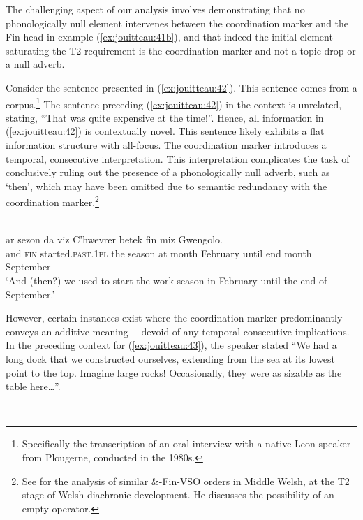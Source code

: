 \documentclass[output=paper,colorlinks,citecolor=brown]{langscibook}
\begin{document}
The challenging aspect of our analysis involves demonstrating that no phonologically null element intervenes between the coordination marker and the Fin head in example (\ref{ex:jouitteau:41b}), and that indeed the initial element saturating the T2 requirement is the coordination marker and not a topic-drop or a null adverb. 

Consider the sentence presented in (\ref{ex:jouitteau:42}). This sentence comes from a corpus.\footnote{Specifically the transcription of an oral interview with a native Leon speaker from Plougerne, conducted in the 1980s.} The sentence preceding (\ref{ex:jouitteau:42}) in the context is unrelated, stating, “That was quite expensive at the time!”. Hence, all information in (\ref{ex:jouitteau:42}) is contextually novel. This sentence likely exhibits a flat information structure with all-focus. The coordination marker introduces a temporal, consecutive interpretation. This interpretation complicates the task of conclusively ruling out the presence of a phonologically null adverb, such as ‘then’, which may have been omitted due to semantic redundancy with the coordination marker.\footnote{See \citet{mj:Willis1997} for the analysis of similar \&-Fin-VSO orders in Middle Welsh, at the T2 stage of Welsh diachronic development. He discusses the possibility of an empty operator.}


\ea \label{ex:jouitteau:42} \\
\gll {} {}    {} ar  sezon   da     viz     C'hwevrer betek  fin  miz    Gwengolo. \\ 
and   \textsc{fin} started\textsc{.past.1pl} the season at month February   until  end month September \\ 
\glt `And (then?) we used to start the work season in February until the end of September.' 
\z 

However, certain instances exist where the coordination marker predominantly conveys an additive meaning~– devoid of any temporal consecutive implications. In the preceding context for (\ref{ex:jouitteau:43}), the speaker stated “We had a long dock that we constructed ourselves, extending from the sea at its lowest point to the top. Imagine large rocks! Occasionally, they were as sizable as the table here…”.

\ea \label{ex:jouitteau:43} \\
    
\end{document}
